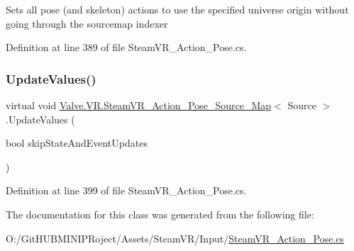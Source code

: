 Sets all pose (and skeleton) actions to use the specified universe origin without going through the sourcemap indexer 



Definition at line 389 of file Steam\+V\+R\+\_\+\+Action\+\_\+\+Pose.\+cs.

\mbox{\label{class_valve_1_1_v_r_1_1_steam_v_r___action___pose___source___map_a1a1ff6dfe3a10879dc5b60f702c2d23a}} 
\subsubsection{\texorpdfstring{UpdateValues()}{UpdateValues()}}
{\footnotesize\ttfamily virtual void \mbox{\hyperlink{class_valve_1_1_v_r_1_1_steam_v_r___action___pose___source___map}{Valve.\+V\+R.\+Steam\+V\+R\+\_\+\+Action\+\_\+\+Pose\+\_\+\+Source\+\_\+\+Map}}$<$ Source $>$.Update\+Values (\begin{DoxyParamCaption}\item[{bool}]{skip\+State\+And\+Event\+Updates }\end{DoxyParamCaption})\hspace{0.3cm}{\ttfamily [virtual]}}



Definition at line 399 of file Steam\+V\+R\+\_\+\+Action\+\_\+\+Pose.\+cs.



The documentation for this class was generated from the following file\+:\begin{DoxyCompactItemize}
\item 
O\+:/\+Git\+H\+U\+B\+M\+I\+N\+I\+P\+Roject/\+Assets/\+Steam\+V\+R/\+Input/\mbox{\hyperlink{_steam_v_r___action___pose_8cs}{Steam\+V\+R\+\_\+\+Action\+\_\+\+Pose.\+cs}}\end{DoxyCompactItemize}
